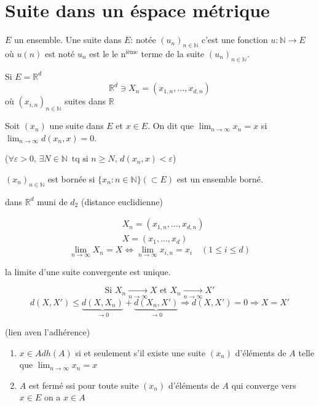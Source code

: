 \documentclass[a4paper]{report}
\newcommand\N{\ensuremath{\mathbb{N}}}
\newcommand\R{\ensuremath{\mathbb{R}}}
\let\implies\Rightarrow
\let\iff\Leftrightarrow
\let\epsilon\varepsilon
\theoremstyle{definition}
\begin{document}
 \section{Suite dans un éspace métrique}
 \begin{definition}
     $E$ un ensemble. Une suite dans $E$: notée $(u_n)_{n \in \N}$ c'est une fonction $u:  \N \to E$ où $u(n)$ est noté  $u_n$ est le le  $\text{n}^{\text{ième}}$ terme de la suite $(u_n)_{n \in \N}$.
     \par
     Si $E = \R^d$
     \[
     \R^d \ni X_n = (x_{1,n}, \ldots, x_{d,n})
     \] 
 où $(x_{i,n})_{n \in \N}$ suites dans $\R$
 \end{definition}
 \begin{definition}
     Soit $(x_n)$ une suite dans  $E$ et  $x \in E$. On dit que  $\lim_{n \to \infty} x_n = x$ si $\lim_{n \to \infty} d(x_n, x) = 0$.
     \par
     ($\forall \epsilon > 0, \, \exists N \in \N \, \text{ tq si } n \ge N, \, d(x_n, x) < \epsilon$)
 \end{definition}
 \begin{prop}
     $(x_n)_{n \in \N}$ est bornée si $\{x_n : n \in \N\} (\subset E)$ est un ensemble borné. 
 \end{prop}
 \begin{remark}
    dans $\R^d$ muni de $d_2$ (distance euclidienne)

    \begin{align*}
        &X_n = (x_{1,n}, \ldots, x_{d,n})\\
        &X = (x_1, \ldots, x_d)
    \end{align*}
    \[
    \lim_{n \to \infty} X_n = X \iff \lim_{n \to \infty} x_{i,n} = x_i \quad (1 \le i \le d)
    \] 
 \end{remark}
 \begin{prop}
    la limite d'une suite convergente est unique. 
 \end{prop}
 \begin{preuve}
    \[
    \text{Si } X_n \xrightarrow[n \to \infty]{} X \text{ et } X_n \xrightarrow[n \to \infty]{} X'
    \]  
    \[
        d(X, X') \le \underbrace{d(X, X_n)}_{\to 0} + \underbrace{d(X_n, X')}_{\to 0} \implies d(X, X') = 0 \implies X = X'
    \] 
 \end{preuve}
 \begin{prop}\label{prop:suite-lien-avec-adherence}
     (lien aven l'adhérence) 
     \begin{enumerate}
         \item $x \in Adh(A)$ si et seulement s'il existe une suite  $(x_n)$ d'éléments de  $A$ telle que  $\lim_{n \to \infty} x_n = x$
         \item $A$ est fermé ssi pour toute suite  $(x_n)$ d'éléments de  $A$ qui converge vers $x \in E$ on a $x \in A$
     \end{enumerate}
 \end{prop}
\end{document}
